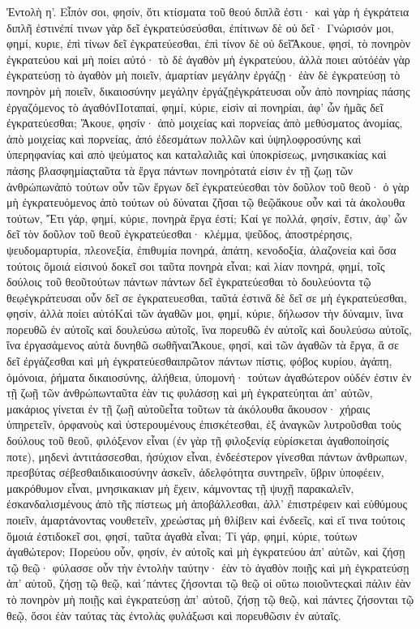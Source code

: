 Ἐντολὴ η’.
Εἶπόν σοι, φησίν, ὅτι κτίσματα τοῦ θεού διπλᾶ ἐστι· καὶ γὰρ ἡ ἐγκράτεια διπλῆ ἐστινἐπί τινων γὰρ δεῖ ἐγκρατεύσεύσθαι, ἐπίτινων δὲ οὐ δεῖ· Γνώρισόν μοι, φημί, κυριε, ἐπὶ τίνων δεῖ ἐγκρατεύεσθαι, ἐπὶ τίνον δὲ οὐ δεῖἌκουε, φησί, τὸ πονηρὸν ἐγκρατεύου καὶ μὴ ποίει αὐτό· τὸ δὲ ἀγαθὸν μὴ ἐγκρατεύου, ἀλλὰ ποιει αὐτόἐὰν γὰρ ἐγκρατεύσῃ τὸ ἀγαθὸν μὴ ποιεῖν, ἁμαρτίαν μεγάλην ἐργάζῃ· ἐὰν δὲ ἐγκρατεύσῃ τὸ πονηρὸν μὴ ποιεῖν, δικαιοσύνην μεγάλην ἐργάζῃἐγκράτευσαι οὖν ἀπὸ πονηρίας πάσης ἐργαζόμενος τὸ ἀγαθόνΠοταπαί, φημί, κύριε, εἰσὶν αἱ πονηρίαι, ἀφ’ ὧν ἡμᾶς δεῖ ἐγκρατεύεσθαι; Ἄκουε, φησίν· ἀπὸ μοιχείας καὶ πορνείας ἀπὸ μεθύσματος ἀνομίας, ἀπὸ μοιχείας καὶ πορνείας, ἀπό ἐδεσμάτων πολλῶν καὶ ὑψηλοφροσύνης καὶ ὑπερηφανίας καὶ απὸ ψεύματος και καταλαλιᾶς καὶ ὑποκρίσεως, μνησικακίας καὶ πάσης βλασφημίαςταῦτα τὰ ἔργα πάντων πονηρότατά εἰσιν ἐν τῇ ζωῃ τῶν ἀνθρώπωνἀπὸ τούτων οὖν τῶν ἔργων δεῖ ἐγκρατεύεσθαι τὸν δοῦλον τοῦ θεοῦ· ὁ γὰρ μὴ ἐγκρατευόμενος ἀπὸ τούτων οὐ δύναται ζῆσαι τῷ θεῷἄκουε οὖν καὶ τὰ ἀκολουθα τούτων, Ἔτι γάρ, φημί, κύριε, πονηρὰ ἔργα ἐστί; Καί γε πολλά, φησίν, ἔστιν, ἀφ’ ὧν δεῖ τὸν δοῦλον τοῦ θεοῦ ἐγκρατεύεσθαι· κλέμμα, ψεῦδος, ἀποστρέρησις, ψευδομαρτυρία, πλεονεξία, ἐπιθυμία πονηρά, ἀπάτη, κενοδοξία, ἀλαζονεία καὶ ὅσα τούτοις ὅμοιά εἰσινοὐ δοκεῖ σοι ταῦτα πονηρὰ εἶναι; καὶ λίαν πονηρά, φημί, τοῖς δούλοις τοῦ θεοῦτούτων πάντων πάντων δεῖ ἐγκρατεύεσθαι τὸ δουλεύοντα τῷ θεῳἐγκράτευσαι οὖν δεῖ σε ἐγκρατευεσθαι, ταῦτά ἐστινἃ δὲ δεῖ σε μὴ ἐγκρατεύεσθαι, φησίν, ἀλλὰ ποίει αὐτόΚαὶ τῶν ἀγαθῶν μοι, φημί, κύριε, δήλωσον τὴν δύναμιν, ἵινα πορευθῶ ἐν αὐτοῖς καὶ δουλεύσω αὐτοῖς, ἵνα πορευθῶ ἐν αὐτοῖς καὶ δουλεύσω αὐτοῖς, ἵνα ἐργασάμενος αὐτὰ δυνηθῶ σωθῆναιἌκουε, φησί, καὶ τῶν ἀγαθῶν τὰ ἔργα, ἃ σε δεῖ ἐργάζεσθαι καὶ μὴ ἐγκρατεύεσθαιπρῶτον πάντων πίστις, φόβος κυρίου, ἀγάπη, ὁμόνοια, ῥήματα δικαιοσύνης, ἀλήθεια, ὑπομονή· τούτων ἀγαθώτερον οὐδέν ἐστιν ἐν τῇ ζωῇ τῶν ἀνθρώπωνταῦτα ἐὰν τις φυλάσσῃ καὶ μὴ ἐγκρατεύηται ἀπ’ αὐτῶν, μακάριος γίνεται ἐν τῇ ζωῇ αὐτοῦεἶτα τοῦτων τὰ ἀκόλουθα ἄκουσον· χήραις ὑπηρετεῖν, ὀρφανοὺς καὶ ὑστερουμένους ἐπισκέτεσθαι, ἐξ ἀναγκῶν λυτροῦσθαι τοὺς δούλους τοῦ θεοῦ, φιλόξενον εἶναι (ἐν γὰρ τῇ φιλοξενίᾳ εὑρίσκεται ἀγαθοποίησίς ποτε), μηδενὶ ἀντιτάσσεσθαι, ἡσύχιον εἶναι, ἐνδεέστερον γίνεσθαι πάντων ἀνθρωπων, πρεσβύτας σέβεσθαιδικαιοσύνην ἀσκεῖν, ἀδελφότητα συντηρεῖν, ὕβριν ὑποφέειν, μακρόθυμον εἶναι, μνησικακιαν μὴ ἔχειν, κάμνοντας τῇ ψυχῇ παρακαλεῖν, ἐσκανδαλισμένους ἀπὸ τῆς πίστεως μὴ ἀποβάλλεσθαι, ἀλλ’ ἐπιστρέφειν καὶ εὐθύμους ποιεῖν, ἁμαρτάνοντας νουθετεῖν, χρεώστας μὴ θλίβειν καὶ ἐνδεεῖς, καὶ εἴ τινα τούτοις ὅμοιά ἐστιδοκεῖ σοι, φησί, ταῦτα ἀγαθὰ εἶναι; Τί γάρ, φημί, κύριε, τούτων ἀγαθώτερον; Πορεύου οὖν, φησίν, ἐν αὐτοῖς καὶ μὴ ἐγκρατεύου ἀπ’ αὐτῶν, καὶ ζήσῃ τῷ θεῷ· φύλασσε οὖν τὴν ἐντολὴν ταύτην· ἐὰν τὸ ἀγαθὸν ποιῇς καὶ μὴ ἐγκρατεύσῃ ἀπ’ αὐτοῦ, ζήσῃ τῷ θεῷ, καὶ´πάντες ζήσονται τῷ θεῷ οἱ οὕτω ποιοῦντεςκαὶ πάλιν ἐὰν τὸ πονηρὸν μὴ ποιῇς καὶ ἐγκρατεύσῃ ἀπ’ αὐτοῦ, ζήσῃ τῷ θεῷ, καὶ πάντες ζήσονται τῷ θεῷ, ὅσοι ἐὰν ταύτας τὰς ἐντολὰς φυλάξωσι καὶ πορευθῶσιν ἐν αὐταῖς.

